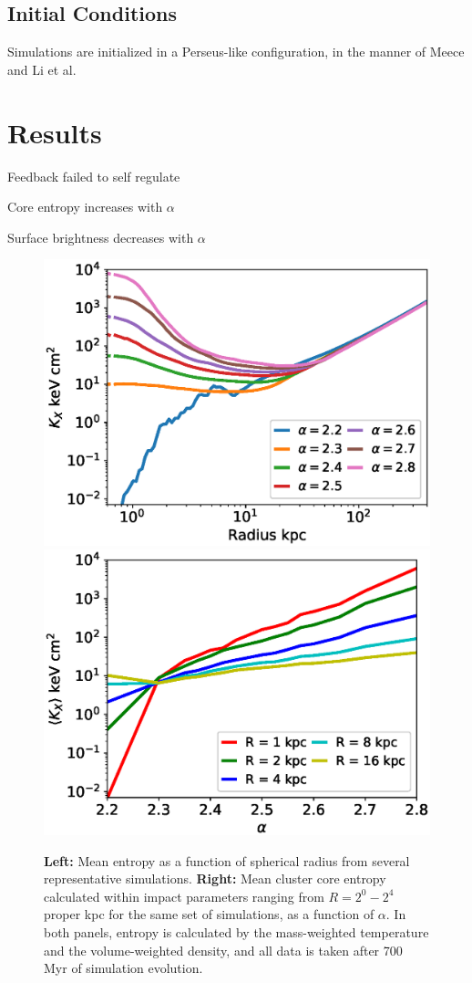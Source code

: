 \documentclass[iop,apjl, twocolappendix]{emulateapj}   %
\begin{document}
\subsection{Initial Conditions}
\label{sec:initial_conditions}
Simulations are initialized in a Perseus-like configuration, in the manner
of Meece \cite{meece_triggering_2017} and Li et al.\ \cite{li_cooling_2015} 

\section{Results}

\textbullet Feedback failed to self regulate

\textbullet Core entropy increases with $\alpha$

\textbullet Surface brightness decreases with $\alpha$


\label{sec:results}
\begin{figure}
	\begin{center}
		\includegraphics[width=0.49\linewidth]{figures/entropyVradius.eps}
		\includegraphics[width=0.49\linewidth]{figures/entropyValpha.eps}
	\end{center}
	\caption{
		\textbf{Left:}  Mean entropy as a function of spherical radius from
	several representative simulations.  \textbf{Right:} Mean cluster core
	entropy calculated within impact parameters ranging from $R = 2^0 - 2^4$ proper
	kpc for the same set of simulations, as a function of $\alpha$.  In both
	panels, entropy is calculated by the mass-weighted temperature and the
	volume-weighted density, and all data is taken after 700 Myr of simulation
	evolution.}
\end{figure}
\end{document}

